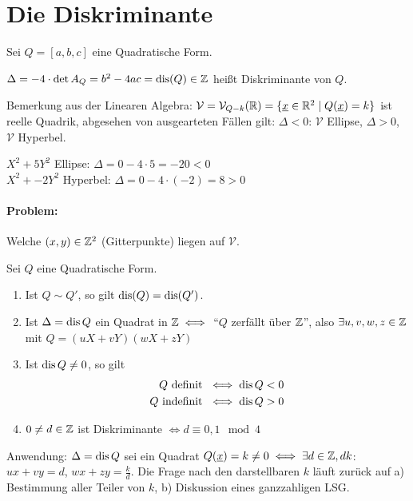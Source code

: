 \documentclass[a4paper,DIV15,BCOR12mm]{article}
\begin{document}
\section{Die Diskriminante}

Sei $Q=[a,b,c]$ eine Quadratische Form.

\begin{definition}
$\Delta =-4 \cdot \det A_Q = b^2 - 4ac = \mathop{\rm dis}\nolimits(Q) \in \mathbb{Z}$ heißt Diskriminante von $Q$.
\end{definition}

Bemerkung aus der Linearen Algebra: $\mathcal{V} = \mathcal{V}_{Q-k}(\mathbb{R}) = \{\underline x \in \mathbb{R}^2 \mid Q(\underline x) = k\}$ ist reelle Quadrik, abgesehen von ausgearteten Fällen gilt: $\Delta <0$: $\mathcal{V}$ Ellipse, $\Delta >0$, $\mathcal{V}$ Hyperbel.

\begin{beispiel}
$X^2 + 5Y^2$ Ellipse: $\Delta = 0-4\cdot 5 = -20 < 0$\\
$X^2 + -2Y^2$ Hyperbel: $\Delta = 0-4\cdot (-2) = 8 > 0$
\end{beispiel}

\paragraph{Problem:} Welche $(x,y)\in\mathbb{Z}^2$ (Gitterpunkte) liegen auf $\mathcal{V}$.

\begin{satz}[Diskriminantensatz]
Sei $Q$ eine Quadratische Form.
\begin{enumerate}
\item Ist $Q\sim Q'$, so gilt $\mathop{\rm dis}\nolimits(Q) = \mathop{\rm dis}\nolimits(Q')$.
\item Ist $\Delta = \mathop{\rm dis}\nolimits Q$ ein Quadrat in $\mathbb{Z} \iff$ "`$Q$ zerfällt über $\mathbb{Z}$"', also $\exists u,v,w,z\in\mathbb{Z}$ mit $Q=(uX+vY)(wX+zY)$
\item Ist $\mathop{\rm dis}\nolimits Q \ne 0$, so gilt 
\begin{align*}
 Q \text{ definit } &\iff \mathop{\rm dis}\nolimits Q <0 \\
 Q \text{ indefinit } &\iff \mathop{\rm dis}\nolimits Q > 0
 \end{align*}
\item $0\ne d\in \mathbb{Z}$ ist Diskriminante $\iff d\equiv 0,1 \mod 4$
\end{enumerate}
\end{satz}

Anwendung: $\Delta = \mathop{\rm dis}\nolimits Q$ sei ein Quadrat
$Q(\underline x) = k \ne 0 \iff \exists d\in\mathbb{Z}, d\mit k$: $ux+vy=d$, $wx+zy=\frac kd$. Die Frage nach den darstellbaren $k$ läuft zurück auf a) Bestimmung aller Teiler von $k$, b) Diskussion eines ganzzahligen LSG.
\end{document}
